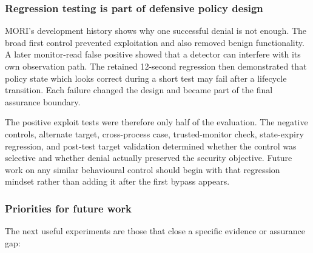 \subsubsection{Regression testing is part of defensive policy design}

MORI's development history shows why one successful denial is not enough. The
broad first control prevented exploitation and also removed benign
functionality. A later monitor-read false positive showed that a detector can
interfere with its own observation path. The retained 12-second regression then
demonstrated that policy state which looks correct during a short test may fail
after a lifecycle transition. Each failure changed the design and became part
of the final assurance boundary.

The positive exploit tests were therefore only half of the evaluation. The
negative controls, alternate target, cross-process case, trusted-monitor check,
state-expiry regression, and post-test target validation determined whether the
control was selective and whether denial actually preserved the security
objective. Future work on any similar behavioural control should begin with
that regression mindset rather than adding it after the first bypass appears.

\subsubsection{Priorities for future work}

The next useful experiments are those that close a specific evidence or
assurance gap:

